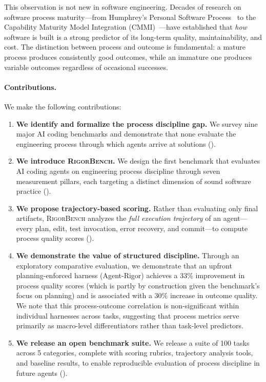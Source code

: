 \documentclass[letterpaper, 10 pt, conference]{ieeeconf}
\newcommand{\bench}{\textsc{RigorBench}}
\begin{document}
This observation is not new in software engineering.
Decades of research on software process maturity---from Humphrey's Personal Software Process~\cite{humphrey1989managing} to the Capability Maturity Model Integration (CMMI)~\cite{cmmi2018}---have established that \emph{how} software is built is a strong predictor of its long-term quality, maintainability, and cost.
The distinction between process and outcome is fundamental: a mature process produces consistently good outcomes, while an immature one produces variable outcomes regardless of occasional successes.

\paragraph{Contributions.}
We make the following contributions:

\begin{enumerate}[leftmargin=*,itemsep=2pt]
  \item \textbf{We identify and formalize the process discipline gap.}
  We survey nine major AI coding benchmarks and demonstrate that none evaluate the engineering process through which agents arrive at solutions ().

  \item \textbf{We introduce \bench{}.}
  We design the first benchmark that evaluates AI coding agents on engineering process discipline through seven measurement pillars, each targeting a distinct dimension of sound software practice ().

  \item \textbf{We propose trajectory-based scoring.}
  Rather than evaluating only final artifacts, \bench{} analyzes the \emph{full execution trajectory} of an agent---every plan, edit, test invocation, error recovery, and commit---to compute process quality scores ().

  \item \textbf{We demonstrate the value of structured discipline.}
  Through an exploratory comparative evaluation, we demonstrate that an upfront planning-enforced harness (Agent-Rigor) achieves a 33\% improvement in process quality scores (which is partly by construction given the benchmark's focus on planning) and is associated with a 30\% increase in outcome quality. We note that this process-outcome correlation is non-significant within individual harnesses across tasks, suggesting that process metrics serve primarily as macro-level differentiators rather than task-level predictors.

  \item \textbf{We release an open benchmark suite.}
  We release a suite of 100 tasks across 5 categories, complete with scoring rubrics, trajectory analysis tools, and baseline results, to enable reproducible evaluation of process discipline in future agents ().
\end{enumerate}
\end{document}
